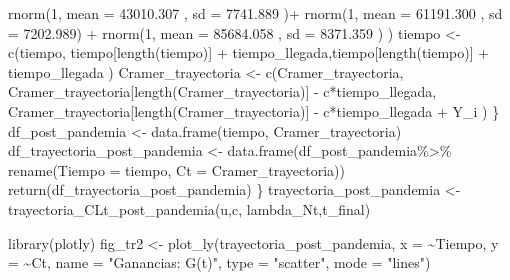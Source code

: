 \documentclass[
  us-letterpaper,
]{scrreprt}
\newenvironment{Shaded}{\begin{snugshade}}{\end{snugshade}}
\newcommand{\AttributeTok}[1]{\textcolor[rgb]{0.40,0.45,0.13}{#1}}
\newcommand{\DecValTok}[1]{\textcolor[rgb]{0.68,0.00,0.00}{#1}}
\newcommand{\FloatTok}[1]{\textcolor[rgb]{0.68,0.00,0.00}{#1}}
\newcommand{\FunctionTok}[1]{\textcolor[rgb]{0.28,0.35,0.67}{#1}}
\newcommand{\NormalTok}[1]{\textcolor[rgb]{0.00,0.23,0.31}{#1}}
\newcommand{\OtherTok}[1]{\textcolor[rgb]{0.00,0.23,0.31}{#1}}
\newcommand{\SpecialCharTok}[1]{\textcolor[rgb]{0.37,0.37,0.37}{#1}}
\newcommand{\StringTok}[1]{\textcolor[rgb]{0.13,0.47,0.30}{#1}}
\theoremstyle{plain}
\theoremstyle{plain}
\theoremstyle{definition}
\theoremstyle{remark}
\begin{document}
\begin{Shaded}
\begin{Highlighting}[]
             \FunctionTok{rnorm}\NormalTok{(}\DecValTok{1}\NormalTok{, }\AttributeTok{mean =} \FloatTok{43010.307}\NormalTok{  , }\AttributeTok{sd =} \FloatTok{7741.889}\NormalTok{ )}\SpecialCharTok{+} 
             \FunctionTok{rnorm}\NormalTok{(}\DecValTok{1}\NormalTok{, }\AttributeTok{mean =} \FloatTok{61191.300}\NormalTok{  , }\AttributeTok{sd =} \FloatTok{7202.989}\NormalTok{) }\SpecialCharTok{+} 
             \FunctionTok{rnorm}\NormalTok{(}\DecValTok{1}\NormalTok{, }\AttributeTok{mean =}  \FloatTok{85684.058}\NormalTok{ , }\AttributeTok{sd =} \FloatTok{8371.359}\NormalTok{ ) ) }
\NormalTok{tiempo }\OtherTok{\textless{}{-}} \FunctionTok{c}\NormalTok{(tiempo, tiempo[}\FunctionTok{length}\NormalTok{(tiempo)] }\SpecialCharTok{+}
\NormalTok{              tiempo\_llegada,tiempo[}\FunctionTok{length}\NormalTok{(tiempo)] }\SpecialCharTok{+}
\NormalTok{              tiempo\_llegada ) }
\NormalTok{Cramer\_trayectoria }\OtherTok{\textless{}{-}} \FunctionTok{c}\NormalTok{(Cramer\_trayectoria,}
\NormalTok{Cramer\_trayectoria[}\FunctionTok{length}\NormalTok{(Cramer\_trayectoria)] }\SpecialCharTok{{-}}
\NormalTok{  c}\SpecialCharTok{*}\NormalTok{tiempo\_llegada, }
\NormalTok{Cramer\_trayectoria[}\FunctionTok{length}\NormalTok{(Cramer\_trayectoria)] }\SpecialCharTok{{-}}
\NormalTok{  c}\SpecialCharTok{*}\NormalTok{tiempo\_llegada }\SpecialCharTok{+}\NormalTok{  Y\_i )}
\NormalTok{  \}}
\NormalTok{  df\_post\_pandemia }\OtherTok{\textless{}{-}} \FunctionTok{data.frame}\NormalTok{(tiempo, Cramer\_trayectoria)}
\NormalTok{df\_trayectoria\_post\_pandemia }\OtherTok{\textless{}{-}} \FunctionTok{data.frame}\NormalTok{(df\_post\_pandemia}\SpecialCharTok{\%\textgreater{}\%} 
                                        \FunctionTok{rename}\NormalTok{(}\AttributeTok{Tiempo =}\NormalTok{ tiempo,}
                                        \AttributeTok{Ct =}\NormalTok{ Cramer\_trayectoria))}
  \FunctionTok{return}\NormalTok{(df\_trayectoria\_post\_pandemia)}
\NormalTok{\}}
\NormalTok{trayectoria\_post\_pandemia }\OtherTok{\textless{}{-}} \FunctionTok{trayectoria\_CLt\_post\_pandemia}\NormalTok{(u,c,}
\NormalTok{                                              lambda\_Nt,t\_final)}


\FunctionTok{library}\NormalTok{(plotly)}
\NormalTok{fig\_tr2 }\OtherTok{\textless{}{-}} \FunctionTok{plot\_ly}\NormalTok{(trayectoria\_post\_pandemia, }\AttributeTok{x =} \SpecialCharTok{\textasciitilde{}}\NormalTok{Tiempo, }
                                              \AttributeTok{y =} \SpecialCharTok{\textasciitilde{}}\NormalTok{Ct, }
          \AttributeTok{name =} \StringTok{"Ganancias: G(t)"}\NormalTok{,}
          \AttributeTok{type =} \StringTok{"scatter"}\NormalTok{, }\AttributeTok{mode =} \StringTok{"lines"}\NormalTok{)}


\end{Highlighting}
\end{Shaded}
\end{document}
